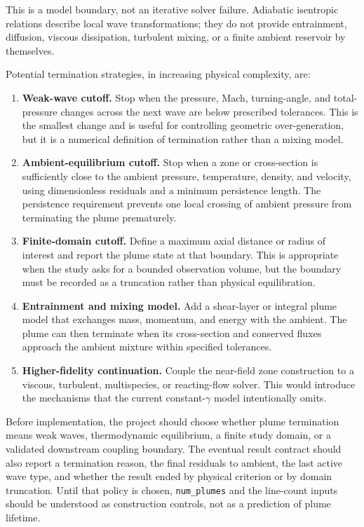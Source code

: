 \documentclass[11pt]{article}
\begin{document}
This is a model boundary, not an iterative solver failure.  Adiabatic
isentropic relations describe local wave transformations; they do not provide
entrainment, diffusion, viscous dissipation, turbulent mixing, or a finite
ambient reservoir by themselves.

Potential termination strategies, in increasing physical complexity, are:

\begin{enumerate}
  \item \textbf{Weak-wave cutoff.} Stop when the pressure, Mach, turning-angle,
    and total-pressure changes across the next wave are below prescribed
    tolerances.  This is the smallest change and is useful for controlling
    geometric over-generation, but it is a numerical definition of
    termination rather than a mixing model.
  \item \textbf{Ambient-equilibrium cutoff.} Stop when a zone or cross-section
    is sufficiently close to the ambient pressure, temperature, density, and
    velocity, using dimensionless residuals and a minimum persistence length.
    The persistence requirement prevents one local crossing of ambient
    pressure from terminating the plume prematurely.
  \item \textbf{Finite-domain cutoff.} Define a maximum axial distance or
    radius of interest and report the plume state at that boundary.  This is
    appropriate when the study asks for a bounded observation volume, but the
    boundary must be recorded as a truncation rather than physical
    equilibration.
  \item \textbf{Entrainment and mixing model.} Add a shear-layer or integral
    plume model that exchanges mass, momentum, and energy with the ambient.
    The plume can then terminate when its cross-section and conserved fluxes
    approach the ambient mixture within specified tolerances.
  \item \textbf{Higher-fidelity continuation.} Couple the near-field zone
    construction to a viscous, turbulent, multispecies, or reacting-flow
    solver.  This would introduce the mechanisms that the current
    constant-\(\gamma\) model intentionally omits.
\end{enumerate}

Before implementation, the project should choose whether plume termination
means weak waves, thermodynamic equilibrium, a finite study domain, or a
validated downstream coupling boundary.  The eventual result contract should
also report a termination reason, the final residuals to ambient, the last
active wave type, and whether the result ended by physical criterion or by
domain truncation.  Until that policy is chosen, \texttt{num\_plumes} and the
line-count inputs should be understood as construction controls, not as a
prediction of plume lifetime.
\end{document}
